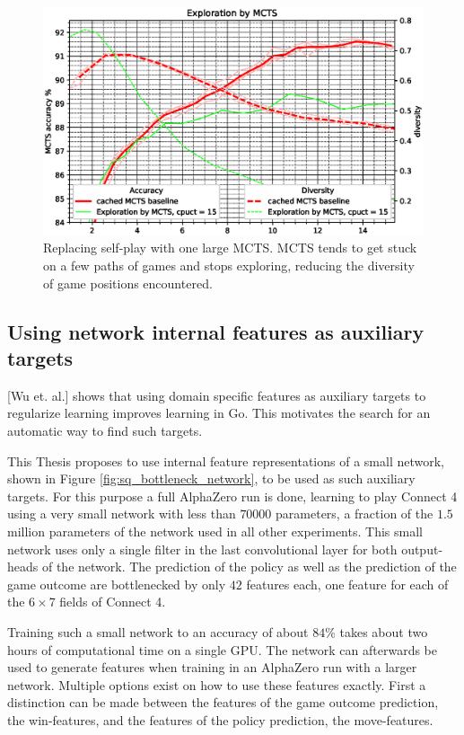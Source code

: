 \documentclass[12pt,onecolumn,oneside,titlepage]{article}
\begin{document}
\begin{figure}[H]
\centering
\includegraphics[clip,width=\columnwidth]{mcts_tree_explore}
\caption{Replacing self-play with one large MCTS. MCTS tends to get stuck on a few paths of games and stops exploring, reducing the diversity of game positions encountered.}
\label{fig:mcts_tree_explore}
\end{figure}


\subsection{Using network internal features as auxiliary targets}

\cite{wu2019accelerating}[Wu et. al.] shows that using domain specific features as auxiliary targets to regularize learning improves learning in Go. This motivates the search for an automatic way to find such targets.

This Thesis proposes to use internal feature representations of a small network, shown in Figure \ref{fig:sq_bottleneck_network}, to be used as such auxiliary targets. For this purpose a full AlphaZero run is done, learning to play Connect 4 using a very small network with less than $70000$ 
parameters, a fraction of the $1.5$ million parameters of the network used in all other experiments. This small network uses only a single filter in the last convolutional layer for both output-heads of the network. The prediction of the policy as well as the prediction of the game outcome 
are bottlenecked by only $42$ features each, one feature for each of the $6 \times 7$ fields of Connect 4.

Training such a small network to an accuracy of about $84\%$ takes about two hours of computational time on a single GPU. The network can afterwards be used to generate features when training in an AlphaZero run with a larger network.
Multiple options exist on how to use these features exactly. First a distinction can be made between the features of the game outcome prediction, the win-features, and the features of the policy prediction, the move-features.
\end{document}
